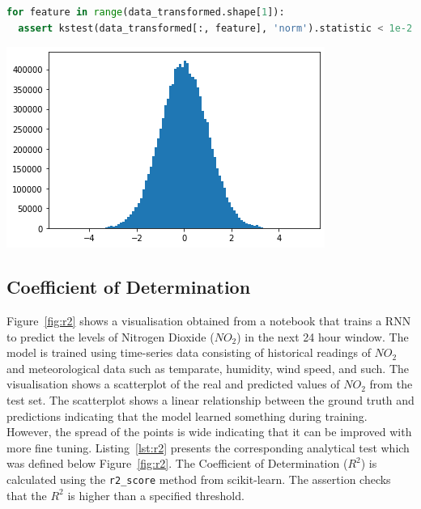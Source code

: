 \documentclass[acmsmall,screen,review,anonymous]{acmart}
\begin{document}
\begin{minipage}{0.45\textwidth}
  \begin{lstlisting}[language=Python]
for feature in range(data_transformed.shape[1]):
  assert kstest(data_transformed[:, feature], 'norm').statistic < 1e-2
  \end{lstlisting}
  \label{lst:kstest}
\end{minipage}
\hfill
\begin{minipage}{0.45\textwidth}
  \includegraphics[width=\linewidth]{../catalogue/select-152a.png}
  \label{fig:kstest}
\end{minipage}

\subsection{Coefficient of Determination}

Figure~\ref{fig:r2} shows a visualisation obtained from a notebook that trains a RNN to predict the levels of Nitrogen Dioxide ($NO_2$) in the next 24 hour window. The model is trained using time-series data consisting of historical readings of $NO_2$ and meteorological data such as temparate, humidity, wind speed, and such. The visualisation shows a scatterplot of the real and predicted values of $NO_2$ from the test set. The scatterplot shows a linear relationship between the ground truth and predictions indicating that the model learned something during training. However, the spread of the points is wide indicating that it can be improved with more fine tuning. Listing~\ref{lst:r2} presents the corresponding analytical test which was defined below Figure~\ref{fig:r2}. The Coefficient of Determination ($R^2$) is calculated using the \texttt{r2\_score} method from scikit-learn. The assertion checks that the $R^2$ is higher than a specified threshold.
\end{document}
